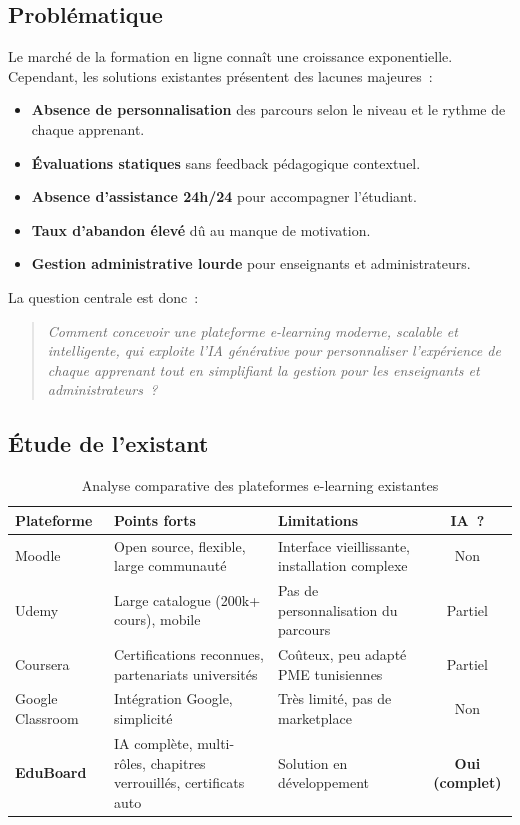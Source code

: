 \subsection{Problématique}

Le marché de la formation en ligne connaît une croissance exponentielle. Cependant,
les solutions existantes présentent des lacunes majeures~:

\begin{itemize}
  \item \textbf{Absence de personnalisation} des parcours selon le niveau et le rythme
        de chaque apprenant.
  \item \textbf{Évaluations statiques} sans feedback pédagogique contextuel.
  \item \textbf{Absence d'assistance 24h/24} pour accompagner l'étudiant.
  \item \textbf{Taux d'abandon élevé} dû au manque de motivation.
  \item \textbf{Gestion administrative lourde} pour enseignants et administrateurs.
\end{itemize}

\medskip
La question centrale est donc~:

\begin{quote}
\textit{Comment concevoir une plateforme e-learning moderne, scalable et intelligente,
qui exploite l'\ac{IA} générative pour personnaliser l'expérience de chaque apprenant
tout en simplifiant la gestion pour les enseignants et administrateurs~?}
\end{quote}

\subsection{Étude de l'existant}

\begin{table}[H]
  \centering
  \caption{Analyse comparative des plateformes e-learning existantes}
  \label{tab:existant}
  \begin{tabularx}{\textwidth}{lXXc}
    \toprule
    \textbf{Plateforme} & \textbf{Points forts} & \textbf{Limitations} & \textbf{\ac{IA}~?} \\
    \midrule
    Moodle      & Open source, flexible, large communauté & Interface vieillissante, installation complexe & Non \\
    \midrule
    Udemy       & Large catalogue (200k+ cours), mobile  & Pas de personnalisation du parcours & Partiel \\
    \midrule
    Coursera    & Certifications reconnues, partenariats universités & Coûteux, peu adapté PME tunisiennes & Partiel \\
    \midrule
    Google Classroom & Intégration Google, simplicité & Très limité, pas de marketplace & Non \\
    \midrule
    \textbf{EduBoard} & IA complète, multi-rôles, chapitres verrouillés, certificats auto & Solution en développement & \textbf{Oui (complet)} \\
    \bottomrule
  \end{tabularx}
\end{table}

